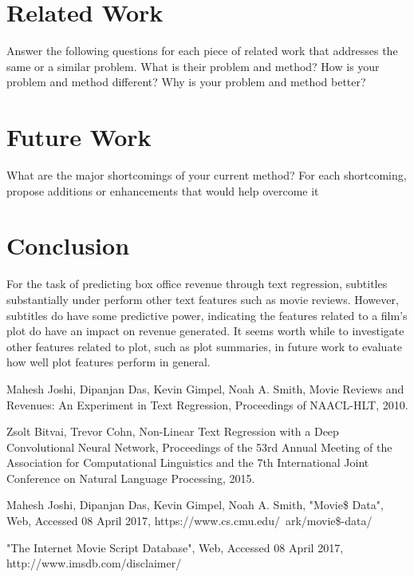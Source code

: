 \documentclass[11pt]{article}
\begin{document}
\section{Related Work}
Answer the following questions for each piece of related work that addresses the same or
a similar problem. What is their problem and method? How is your problem and method
different? Why is your problem and method better?

\section{Future Work}
What are the major shortcomings of your current method? For each shortcoming, propose
additions or enhancements that would help overcome it

\section{Conclusion}
For the task of predicting box office revenue through text regression, subtitles
substantially under perform other text features such as movie reviews. However,
subtitles do have some predictive power, indicating the features related to a film's plot
do have an impact on revenue generated. It seems worth while to investigate other
features related to plot, such as plot summaries, in future work to evaluate how well
plot features perform in general.

\begin{thebibliography}{9}

  Mahesh Joshi, Dipanjan Das, Kevin Gimpel, Noah A. Smith,
  Movie Reviews and Revenues: An Experiment in Text Regression,
  Proceedings of NAACL-HLT,
  2010.
  
    Zsolt Bitvai, Trevor Cohn,
    Non-Linear Text Regression with a Deep Convolutional Neural Network,
    Proceedings of the 53rd Annual Meeting of the Association for Computational Linguistics
    and the 7th International Joint Conference on Natural Language Processing,
    2015.
    
  Mahesh Joshi, Dipanjan Das, Kevin Gimpel, Noah A. Smith,
  "Movie\$ Data",
  Web,
  Accessed 08 April 2017,
  https://www.cs.cmu.edu/~ark/movie\$-data/

    "The Internet Movie Script Database",
    Web,
    Accessed 08 April 2017,
    http://www.imsdb.com/disclaimer/
  
\end{thebibliography}
\end{document}
